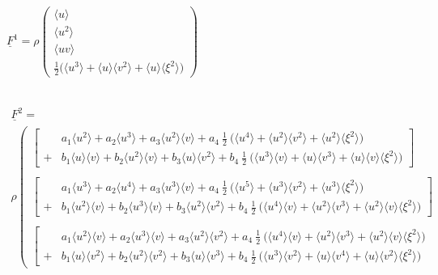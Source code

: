 \documentclass[
	pdftex,             %
	12pt,				%
	a4paper,		   	%
	english,				%
	oneside,			%
]{article}
\newcommand{\mom}[1]{\langle #1 \rangle}
\newcommand{\uu}[1]{\underline{#1}}
\begin{document}
~\\

\begin{math}
\uu{F}^1 =
\rho
\begin{pmatrix}
\mom{u} \\ 
\mom{u^2} \\ 
\mom{uv} \\ 
\frac{1}{2} \big(\mom{u^3} + \mom{u}\mom{v^2} + \mom{u}\mom{\xi^2} \big)
\end{pmatrix}
\end{math}

~\\

\begin{math}
\begin{array}{l}
\uu{F}^2 
=
\\
\rho
\left(
\begin{array}{l}
\left[
\begin{array}{ll}
  & a_1 \mom{u^2} + 
    a_2 \mom{u^3} +
    a_3 \mom{u^2}\mom{v} +
    a_4 ~\tfrac{1}{2}~\big( \mom{u^4} + \mom{u^2}\mom{v^2} + \mom{u^2}\mom{\xi^2} \big)
\\	
+ & b_1 \mom{u}\mom{v} +
b_2 \mom{u^2}\mom{v} +
b_3 \mom{u}\mom{v^2} +
b_4 ~\tfrac{1}{2}~\big( \mom{u^3}\mom{v} + \mom{u}\mom{v^3} + \mom{u}\mom{v}\mom{\xi^2} \big)
\end{array}
\right]
\\ ~\\
\left[
\begin{array}{ll}
&
a_1 \mom{u^3} +
a_2 \mom{u^4} +
a_3 \mom{u^3}\mom{v} +
a_4 ~\tfrac{1}{2}~\big( \mom{u^5} + \mom{u^3}\mom{v^2} + \mom{u^3}\mom{\xi^2} \big)
\\	
+&
b_1 \mom{u^2}\mom{v} +
b_2 \mom{u^3}\mom{v}+
b_3 \mom{u^2}\mom{v^2}+
b_4 ~\tfrac{1}{2}~\big( \mom{u^4}\mom{v} + \mom{u^2}\mom{v^3} + \mom{u^2}\mom{v}\mom{\xi^2} \big)
\end{array}
\right]
\\ ~ \\
\left[
\begin{array}{ll}
&
a_1 \mom{u^2}\mom{v} +
a_2 \mom{u^3}\mom{v} +
a_3 \mom{u^2}\mom{v^2} +
a_4 ~\tfrac{1}{2}~\big( \mom{u^4}\mom{v} + \mom{u^2}\mom{v^3} + \mom{u^2}\mom{v}\mom{\xi^2} \big)
\\	
+ &
b_1 \mom{u}\mom{v^2} +
b_2 \mom{u^2}\mom{v^2}+
b_3 \mom{u}\mom{v^3}+
b_4 ~\tfrac{1}{2}~\big( \mom{u^3}\mom{v^2} + \mom{u}\mom{v^4} + \mom{u}\mom{v^2}\mom{\xi^2} \big)
\end{array}

\end{array}
\end{array}
\end{math}
\end{document}
